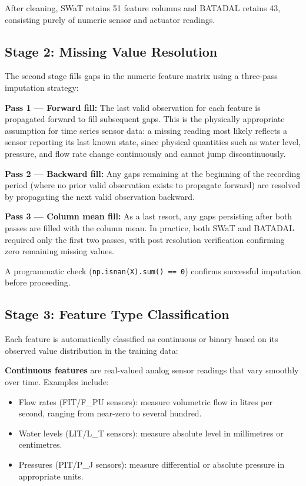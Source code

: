 After cleaning, SWaT retains 51 feature columns and BATADAL retains 43,
consisting purely of numeric sensor and actuator readings.

\subsection{Stage 2: Missing Value Resolution}

The second stage fills gaps in the numeric feature matrix using a three-pass
imputation strategy:

\textbf{Pass 1 --- Forward fill:} The last valid observation for each feature
is propagated forward to fill subsequent gaps. This is the physically appropriate
assumption for time series sensor data: a missing reading most likely reflects
a sensor reporting its last known state, since physical quantities such as water
level, pressure, and flow rate change continuously and cannot jump discontinuously.

\textbf{Pass 2 --- Backward fill:} Any gaps remaining at the beginning of the
recording period (where no prior valid observation exists to propagate forward)
are resolved by propagating the next valid observation backward.

\textbf{Pass 3 --- Column mean fill:} As a last resort, any gaps persisting
after both passes are filled with the column mean. In practice, both SWaT and
BATADAL required only the first two passes, with post resolution verification
confirming zero remaining missing values.

A programmatic check (\texttt{np.isnan(X).sum() == 0}) confirms successful
imputation before proceeding.

\subsection{Stage 3: Feature Type Classification}

Each feature is automatically classified as continuous or binary based on its
observed value distribution in the training data:

\textbf{Continuous features} are real-valued analog sensor readings that vary
smoothly over time. Examples include:
\begin{itemize}
  \item Flow rates (FIT/F\_PU sensors): measure volumetric flow in litres per
  second, ranging from near-zero to several hundred.
  \item Water levels (LIT/L\_T sensors): measure absolute level in millimetres
  or centimetres.
  \item Pressures (PIT/P\_J sensors): measure differential or absolute pressure
  in appropriate units.
\end{itemize}

